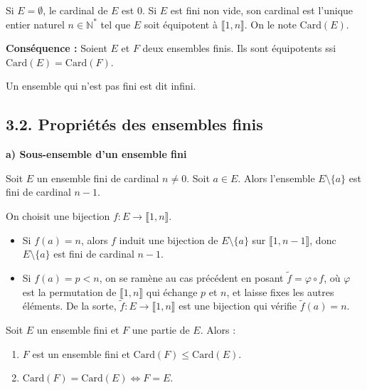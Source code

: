 \documentclass[a4paper,11pt]{article}
\newcommand{\N}{\mathbb{N}}
\begin{document}
\begin{definition}
Si $E = \emptyset$, le cardinal de $E$ est $0$.
Si $E$ est fini non vide, son cardinal est l'unique entier naturel $n \in \N^*$ tel que $E$ soit équipotent à $\llbracket 1, n \rrbracket$. On le note $\text{Card}(E)$.
\end{definition}

\textbf{Conséquence :} Soient $E$ et $F$ deux ensembles finis. Ils sont équipotents ssi $\text{Card}(E) = \text{Card}(F)$.

\begin{definition}
Un ensemble qui n'est pas fini est dit infini.
\end{definition}

\subsection{3.2. Propriétés des ensembles finis}

\textbf{a) Sous-ensemble d'un ensemble fini}

\begin{lemme}
Soit $E$ un ensemble fini de cardinal $n \neq 0$. Soit $a \in E$. Alors l'ensemble $E \setminus \{a\}$ est fini de cardinal $n - 1$.
\end{lemme}

\begin{demonstration}
On choisit une bijection $f : E \to \llbracket 1, n \rrbracket$.
\begin{itemize}
    \item Si $f(a) = n$, alors $f$ induit une bijection de $E \setminus \{a\}$ sur $\llbracket 1, n-1 \rrbracket$, donc $E \setminus \{a\}$ est fini de cardinal $n - 1$.
    \item Si $f(a) = p < n$, on se ramène au cas précédent en posant $\tilde{f} = \varphi \circ f$, où $\varphi$ est la permutation de $\llbracket 1, n \rrbracket$ qui échange $p$ et $n$, et laisse fixes les autres éléments. De la sorte, $\tilde{f} : E \to \llbracket 1, n \rrbracket$ est une bijection qui vérifie $\tilde{f}(a) = n$.
\end{itemize}
\end{demonstration}

\begin{theoreme}
Soit $E$ un ensemble fini et $F$ une partie de $E$. Alors :
\begin{enumerate}
    \item $F$ est un ensemble fini et $\text{Card}(F) \le \text{Card}(E)$.
    \item $\text{Card}(F) = \text{Card}(E) \iff F = E$.
\end{enumerate}
\end{theoreme}
\end{document}
